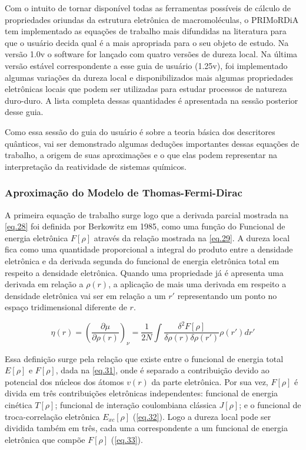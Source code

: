 \documentclass[a4paper,11pt]{refart}
\begin{document}
Com o intuito de tornar disponível todas as ferramentas possíveis de cálculo de propriedades oriundas da estrutura eletrônica de macromoléculas, o PRIMoRDiA tem implementado as equações de trabalho mais difundidas na literatura para que o usuário decida qual é a mais apropriada para o seu objeto de estudo. Na versão 1.0v o software for lançado com quatro versões de dureza local. Na última versão estável correspondente a esse guia de usuário (1.25v), foi implementado algumas variações da dureza local e disponibilizados mais algumas propriedades eletrônicas locais que podem ser utilizadas para estudar processos de natureza duro-duro. A lista completa dessas quantidades é apresentada na sessão posterior desse guia.

Como essa sessão do guia do usuário é sobre a teoria básica dos descritores quânticos, vai ser demonstrado algumas deduções importantes dessas equações de trabalho, a origem de suas aproximações e o que elas podem representar na interpretação da reatividade de sistemas químicos. 

\subsubsection{Aproximação do Modelo de Thomas-Fermi-Dirac}

A primeira equação de trabalho surge logo que a derivada parcial mostrada na \autoref{eq.28} foi definida por Berkowitz em 1985\cite{berkowitz1985concept}, como uma função do Funcional de energia eletrônica $F[\rho]$ através da relação mostrada na \autoref{eq.29}. A dureza local fica como uma quantidade proporcional a integral do produto entre a densidade eletrônica e da derivada segunda do funcional de energia eletrônica total em respeito a densidade eletrônica. Quando uma propriedade já é apresenta uma derivada em relação a $\rho(r)$, a aplicação de mais uma derivada em respeito a densidade eletrônica vai ser em relação a um $r'$ representando um ponto no espaço tridimensional diferente de $r$.  

\begin{equation}
\eta(r) = \left( \frac{\partial \mu}{\partial \rho(r) } \right)_\nu = \frac{1}{2N} \int \frac{\delta^2 F[\rho]}{\delta \rho(r) \delta \rho(r')} \rho(r')dr'
\label{eq.30}
\end{equation}

Essa definição surge pela relação que existe entre o funcional de energia total $E[\rho]$ e $F[\rho]$, dada na \autoref{eq.31}, onde é separado a contribuição devido ao potencial dos núcleos dos átomos $v(r)$ da parte eletrônica. Por sua vez, $F[\rho]$ é divida em três contribuições eletrônicas independentes: funcional de energia cinética $T[\rho]$; funcional de interação coulombiana clássica $J[\rho]$; e o funcional de troca-correlação eletrônica $E_{xc}[\rho]$ (\autoref{eq.32}). Logo a dureza local pode ser dividida também em três, cada uma correspondente a um funcional de energia eletrônica que compõe $F[\rho]$ (\autoref{eq.33}). 
\end{document}
